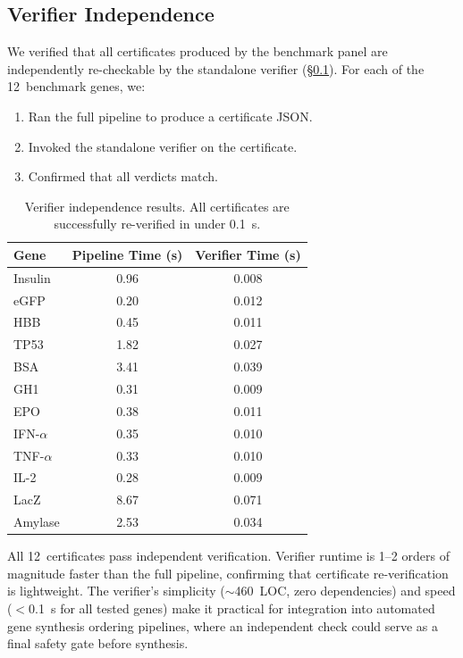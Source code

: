\documentclass[acmsmall,review,anonymous]{acmart}
\begin{document}
\subsection{Verifier Independence}\label{sec:verifiereval}

We verified that all certificates produced by the benchmark panel are
independently re-checkable by the standalone verifier
(\S\ref{sec:verifiereval}).  For each of the 12~benchmark genes, we:

\begin{enumerate}[leftmargin=*,itemsep=0pt,topsep=1pt]
\item Ran the full pipeline to produce a certificate JSON.
\item Invoked the standalone verifier on the certificate.
\item Confirmed that all verdicts match.
\end{enumerate}

\begin{table}[t]
\centering
\caption{Verifier independence results.  All certificates are
         successfully re-verified in under 0.1~s.}
\label{tab:verifier}
\begin{tabular}{lcc}
\toprule
\textbf{Gene} & \textbf{Pipeline Time (s)} & \textbf{Verifier Time (s)} \\
\midrule
Insulin      & 0.96  & 0.008 \\
eGFP         & 0.20  & 0.012 \\
HBB          & 0.45  & 0.011 \\
TP53         & 1.82  & 0.027 \\
BSA          & 3.41  & 0.039 \\
GH1          & 0.31  & 0.009 \\
EPO          & 0.38  & 0.011 \\
IFN-$\alpha$ & 0.35  & 0.010 \\
TNF-$\alpha$ & 0.33  & 0.010 \\
IL-2         & 0.28  & 0.009 \\
LacZ         & 8.67  & 0.071 \\
Amylase      & 2.53  & 0.034 \\
\bottomrule
\end{tabular}
\end{table}

All 12~certificates pass independent verification.  Verifier runtime is
1--2 orders of magnitude faster than the full pipeline, confirming that
certificate re-verification is lightweight.  The verifier's simplicity
($\sim$460~LOC, zero dependencies) and speed ($<$0.1~s for all tested
genes) make it practical for integration into automated gene synthesis
ordering pipelines, where an independent check could serve as a final
safety gate before synthesis.
\end{document}
